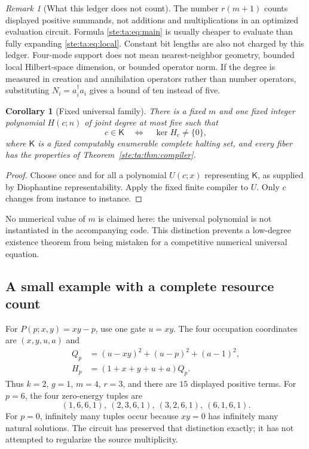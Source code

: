 \documentclass[11pt,letterpaper]{article}
\newtheorem{corollary}[theorem]{Corollary}
\theoremstyle{definition}
\theoremstyle{remark}
\newtheorem{remark}[theorem]{Remark}
\begin{document}
\begin{remark}[What this ledger does not count]
The number $r(m+1)$ counts displayed positive summands, not additions and multiplications in an optimized evaluation circuit. Formula \eqref{ste:ta:eq:main} is usually cheaper to evaluate than fully expanding \eqref{ste:ta:eq:local}. Constant bit lengths are also not charged by this ledger. Four-mode support does not mean nearest-neighbor geometry, bounded local Hilbert-space dimension, or bounded operator norm. If the degree is measured in creation and annihilation operators rather than number operators, substituting $N_i=a_i^\dagger a_i$ gives a bound of ten instead of five.
\end{remark}

\begin{corollary}[Fixed universal family]\label{ste:ta:cor:universal}
There is a fixed $m$ and one fixed integer polynomial $H(c;n)$ of joint degree at most five such that
\[
c\in\mathsf K\quad\Longleftrightarrow\quad\ker H_c\ne\{0\},
\]
where $\mathsf K$ is a fixed computably enumerable complete halting set, and every fiber has the properties of Theorem~\ref{ste:ta:thm:compiler}.
\end{corollary}
\begin{proof}
Choose once and for all a polynomial $U(c;x)$ representing $\mathsf K$, as supplied by Diophantine representability. Apply the fixed finite compiler to $U$. Only $c$ changes from instance to instance.
\end{proof}

No numerical value of $m$ is claimed here: the universal polynomial is not instantiated in the accompanying code. This distinction prevents a low-degree existence theorem from being mistaken for a competitive numerical universal equation.

\subsection{A small example with a complete resource count}
For $P(p;x,y)=xy-p$, use one gate $u=xy$. The four occupation coordinates are $(x,y,u,a)$ and
\begin{align}
Q_p&=(u-xy)^2+(u-p)^2+(a-1)^2,\\
H_p&=(1+x+y+u+a)Q_p.\label{ste:ta:eq:productexample}
\end{align}
Thus $k=2$, $g=1$, $m=4$, $r=3$, and there are $15$ displayed positive terms. For $p=6$, the four zero-energy tuples are
\[
(1,6,6,1),\ (2,3,6,1),\ (3,2,6,1),\ (6,1,6,1).
\]
For $p=0$, infinitely many tuples occur because $xy=0$ has infinitely many natural solutions. The circuit has preserved that distinction exactly; it has not attempted to regularize the source multiplicity.
\end{document}
